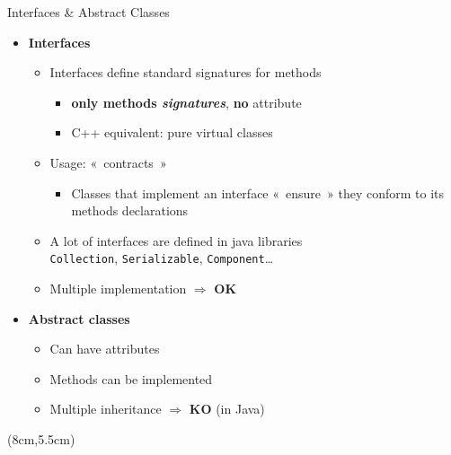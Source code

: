 \documentclass[English,t,%
hyperref={%
    pdftitle={FISA-DE2 OOP in Java},%
    pdfauthor={Guillaume Muller},%
    pdfsubject={OOP in Java},%
    pdfkeywords={OOP,Java}%
    },%
xcolor={pdftex,svgnames} %
]{beamer}
\begin{document}
\begin{frame}{Interfaces \& Abstract Classes}

  \begin{itemize}
    \item<1-> \textbf{Interfaces}
   \begin{itemize}
      \item Interfaces define standard signatures for methods
      \begin{itemize}
        \item \textbf{only methods \textit{signatures}}, \textbf{no} attribute
      \item C++ equivalent: pure virtual classes
    \end{itemize}
    \item Usage: «~contracts~»
    \begin{itemize}
      \item Classes that implement an interface «~ensure~» they
      conform to its methods declarations
    \end{itemize}
%
    \item A lot of interfaces are defined in java libraries\\
    \texttt{Collection}, \texttt{Serializable}, \texttt{Component}\ldots{}
%
    \item Multiple implementation $\Rightarrow$ \textbf{OK}
%
    \end{itemize}
%
    \vspace{2em}
    \item<2> \textbf{Abstract classes}
    \begin{itemize}
      \item Can have attributes
      \item Methods can be implemented
      \item Multiple inheritance $\Rightarrow$ \textbf{KO} (in Java)
    \end{itemize}
%
  \end{itemize}


  \begin{textblock*}{3cm}(8cm,5.5cm)%
  \end{textblock*}


\end{frame}
\end{document}
